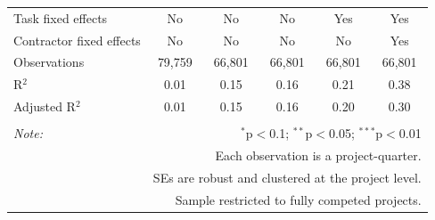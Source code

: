 \documentclass[
]{article}
\begin{document}
\begin{table}[H]
\begin{tabular}{@{\extracolsep{-2pt}}lccccc}
Task fixed effects & No & No & No & Yes & Yes \\ 
Contractor fixed effects & No & No & No & No & Yes \\ 
Observations & 79,759 & 66,801 & 66,801 & 66,801 & 66,801 \\ 
R$^{2}$ & 0.01 & 0.15 & 0.16 & 0.21 & 0.38 \\ 
Adjusted R$^{2}$ & 0.01 & 0.15 & 0.16 & 0.20 & 0.30 \\ 
\hline 
\hline \\[-1.8ex] 
\textit{Note:}  & \multicolumn{5}{r}{$^{*}$p$<$0.1; $^{**}$p$<$0.05; $^{***}$p$<$0.01} \\ 
 & \multicolumn{5}{r}{Each observation is a project-quarter.} \\ 
 & \multicolumn{5}{r}{SEs are robust and clustered at the project level.} \\ 
 & \multicolumn{5}{r}{Sample restricted to fully competed projects.} \\ 
\end{tabular} 
\end{table}
\end{document}
